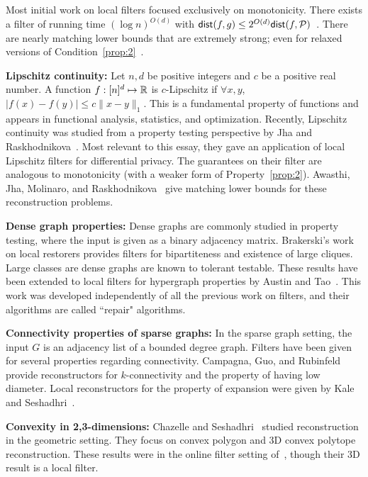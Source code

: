 \documentclass[natbib]{svcyclop}
\def\dist{{\sf dist}}
\begin{document}
Most initial work on local filters focused exclusively on monotonicity.
There exists a filter of running
time $(\log n)^{O(d)}$ with $\dist(f,g) \leq 2^{O(d)}\dist(f,\cP)$~\cite{SS06}.
There are nearly matching lower bounds that are extremely strong; even for relaxed versions of Condition~\ref{prop:2}~\cite{AwJh+12}.

{\bf Lipschitz continuity:} Let $n,d$ be positive integers and $c$ be a positive real number. A function $f:[n]^d \mapsto \mathbb{R}$ is $c$-Lipschitz
if $\forall x,y$, $|f(x) - f(y)| \leq c\|x-y\|_1$. This is a fundamental property
of functions and appears in functional analysis, statistics, and optimization.
Recently, Lipschitz continuity was studied from a property testing perspective by Jha and Raskhodnikova~\cite{JhRa13}.
Most relevant to this essay, they gave an application of local Lipschitz filters
for differential privacy. The guarantees on their filter are analogous to monotonicity
(with a weaker form of Property~\ref{prop:2}). Awasthi, Jha, Molinaro, and Raskhodnikova~\cite{AwJh+12}
give matching lower bounds for these reconstruction problems.
%

{\bf Dense graph properties:} Dense graphs are commonly studied in property testing, where
the input is given as a binary adjacency matrix. Brakerski's work on local restorers provides
filters for bipartiteness and existence of large cliques. Large classes are dense graphs are known
to tolerant testable. These results have been extended to local filters
for hypergraph properties by Austin and Tao~\cite{AT09}. This work was developed independently
of all the previous work on filters, and their algorithms are called ``repair"
algorithms.

{\bf Connectivity properties of sparse graphs:} In the sparse graph setting, the input $G$
is an adjacency list of a bounded degree graph. Filters have been given for several properties regarding connectivity.
Campagna, Guo, and Rubinfeld~\cite{CaGuRu13} provide reconstructors for $k$-connectivity and the property
of having low diameter.
Local reconstructors for the property of expansion were given by Kale and Seshadhri~\cite{KalS11-j}.

{\bf Convexity in 2,3-dimensions:} 
Chazelle and Seshadhri~\cite{ChSe11-j} studied reconstruction in the geometric setting. They focus
on convex polygon and 3D convex polytope reconstruction. These results were in the online filter
setting of~\cite{ACCL2}, though their 3D result is a local filter. 
\end{document}
